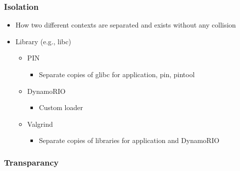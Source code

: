 \subsubsection{Isolation}
\begin{itemize}
	\item How two different contexts are separated and exists without any collision
	\item Library (e.g., libc)
	\begin{itemize}
		\item PIN
		\begin{itemize}
			\item Separate copies of glibc for application, pin, pintool
		\end{itemize}
		\item DynamoRIO
		\begin{itemize}
			\item Custom loader
		\end{itemize}
		\item Valgrind
		\begin{itemize}
			\item Separate copies of libraries for application and DynamoRIO
		\end{itemize}
	\end{itemize}
\end{itemize}
\subsubsection{Transparancy}

